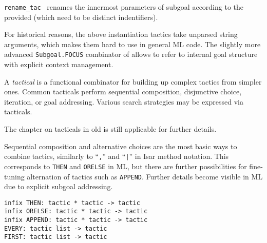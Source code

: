 \begin{isabellebody}
\begin{isamarkuptext}
\begin{description}
  \item \verb|rename_tac|~ renames the innermost
  parameters of subgoal  according to the provided  (which need to be distinct indentifiers).

  \end{description}

  For historical reasons, the above instantiation tactics take
  unparsed string arguments, which makes them hard to use in general
  ML code.  The slightly more advanced \verb|Subgoal.FOCUS| combinator
  of  allows to refer to internal goal
  structure with explicit context management.%
\end{isamarkuptext}%
\isamarkuptrue%
%
\endisatagmlref
{\isafoldmlref}%
%
\isadelimmlref
%
\endisadelimmlref
%
\isamarkuptrue%
%
\begin{isamarkuptext}%
A \emph{tactical} is a functional combinator for building up
  complex tactics from simpler ones.  Common tacticals perform
  sequential composition, disjunctive choice, iteration, or goal
  addressing.  Various search strategies may be expressed via
  tacticals.

  \medskip The chapter on tacticals in old \cite{isabelle-ref} is
  still applicable for further details.%
\end{isamarkuptext}%
\isamarkuptrue%
%
\isamarkuptrue%
%
\begin{isamarkuptext}%
Sequential composition and alternative choices are the most
  basic ways to combine tactics, similarly to ``\verb|,|'' and
  ``\verb||\verb,|,\verb||'' in Isar method notation.  This corresponds to
  \verb|THEN| and \verb|ORELSE| in ML, but there are further
  possibilities for fine-tuning alternation of tactics such as \verb|APPEND|.  Further details become visible in ML due to explicit
  subgoal addressing.%
\end{isamarkuptext}%
\isamarkuptrue%
%
\isadelimmlref
%
\endisadelimmlref
%
\isatagmlref
%
\begin{isamarkuptext}%
\begin{mldecls}
  \verb|infix THEN: tactic * tactic -> tactic| \\
  \verb|infix ORELSE: tactic * tactic -> tactic| \\
  \verb|infix APPEND: tactic * tactic -> tactic| \\
  \verb|EVERY: tactic list -> tactic| \\
  \verb|FIRST: tactic list -> tactic| \\[0.5ex]


\end{mldecls}
\end{isamarkuptext}
\end{isabellebody}
